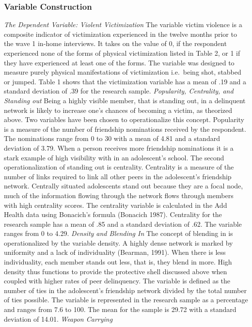 \documentclass[]{article}
\begin{document}
\subsubsection{Variable Construction}\label{variable-construction}

\emph{The Dependent Variable: Violent Victimization} The variable victim
violence is a composite indicator of victimization experienced in the
twelve months prior to the wave 1 in-home interviews. It takes on the
value of 0, if the respondent experienced none of the forms of physical
victimization listed in Table 2, or 1 if they have experienced at least
one of the forms. The variable was designed to measure purely physical
manifestations of victimization i.e.~being shot, stabbed or jumped.
Table 1 shows that the victimization variable has a mean of .19 and a
standard deviation of .39 for the research sample. \emph{Popularity,
Centrality, and Standing out} Being a highly visible member, that is
standing out, in a delinquent network is likely to increase one's
chances of becoming a victim, as theorized above. Two variables have
been chosen to operationalize this concept. Popularity is a measure of
the number of friendship nominations received by the respondent. The
nominations range from 0 to 30 with a mean of 4.81 and a standard
deviation of 3.79. When a person receives more friendship nominations it
is a stark example of high visibility with in an adolescent's school.
The second operationalization of standing out is centrality. Centrality
is a measure of the number of links required to link all other peers in
the adolescent's friendship network. Centrally situated adolescents
stand out because they are a focal node, much of the information flowing
through the network flows through members with high centrality scores.
The centrality variable is calculated in the Add Health data using
Bonacich's formula (Bonacich 1987). Centrality for the research sample
has a mean of .85 and a standard deviation of .62. The variable ranges
from 0 to 4.29. \emph{Density and Blending In} The concept of blending
in is operationalized by the variable density. A highly dense network is
marked by uniformity and a lack of individuality (Bearman, 1991). When
there is less individuality, each member stands out less, that is, they
blend in more. High density thus functions to provide the protective
shell discussed above when coupled with higher rates of peer
delinquency. The variable is defined as the number of ties in the
adolescent's friendship network divided by the total number of ties
possible. The variable is represented in the research sample as a
percentage and ranges from 7.6 to 100. The mean for the sample is 29.72
with a standard deviation of 14.01. \emph{Weapon Carrying}
\end{document}

